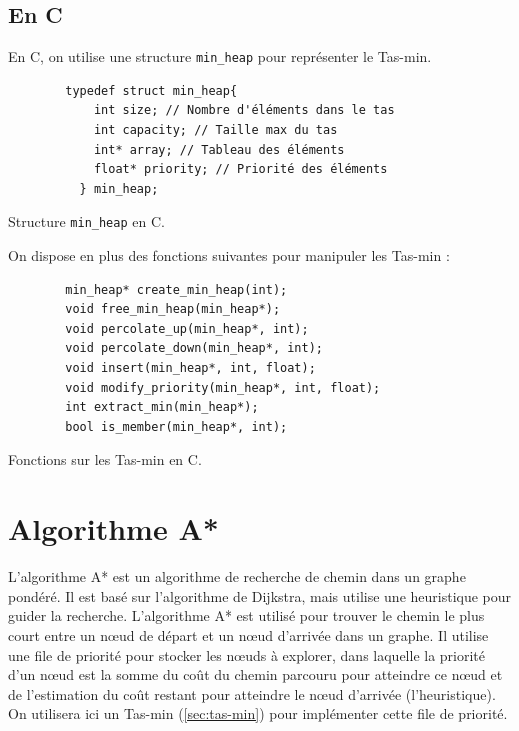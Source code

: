\subsection{En C}

En C, on utilise une structure \texttt{min\_heap} pour représenter le Tas-min.

\begin{listing}[!htpb]
    \begin{verbatim}
        typedef struct min_heap{
            int size; // Nombre d'éléments dans le tas
            int capacity; // Taille max du tas
            int* array; // Tableau des éléments
            float* priority; // Priorité des éléments
          } min_heap;
    \end{verbatim}
    \caption{Structure \texttt{min\_heap} en C.}
    \label{listing:c-min_heap}
\end{listing}

On dispose en plus des fonctions suivantes pour manipuler les Tas-min :

\begin{listing}[!htpb]
    \begin{verbatim}
        min_heap* create_min_heap(int);
        void free_min_heap(min_heap*);
        void percolate_up(min_heap*, int);
        void percolate_down(min_heap*, int);
        void insert(min_heap*, int, float);
        void modify_priority(min_heap*, int, float);
        int extract_min(min_heap*);
        bool is_member(min_heap*, int); 
    \end{verbatim}
    \caption{Fonctions sur les Tas-min en C.}
    \label{listing:c-min_heap-fonctions}
\end{listing}

\section{Algorithme A*}
\label{sec:a-star}

L'algorithme A* est un algorithme de recherche de chemin dans un graphe pondéré.
Il est basé sur l'algorithme de Dijkstra, mais utilise une heuristique pour guider la recherche.
L'algorithme A* est utilisé pour trouver le chemin le plus court entre un nœud de départ et un nœud d'arrivée dans un graphe.
\newline
Il utilise une file de priorité pour stocker les nœuds à explorer, dans laquelle la priorité d'un nœud est la somme du coût du chemin parcouru pour atteindre ce nœud et de l'estimation du coût restant pour atteindre le nœud d'arrivée (l'heuristique). 
On utilisera ici un Tas-min (\autoref{sec:tas-min}) pour implémenter cette file de priorité.

